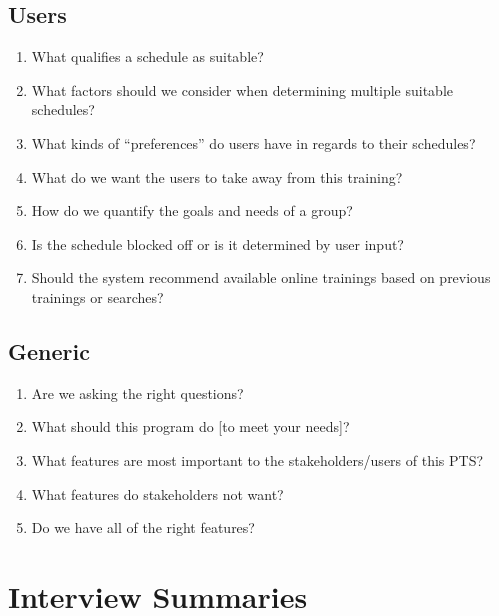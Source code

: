 \documentclass[12pt]{article}
\begin{document}
\subsection{Users}
\begin{enumerate}
\item What qualifies a schedule as suitable?
\item What factors should we consider when determining multiple suitable schedules?
\item What kinds of “preferences” do users have in regards to their schedules?
\item What do we want the users to take away from this training? 
\item How do we quantify the goals and needs of a group? 
\item Is the schedule blocked off or is it determined by user input?
\item Should the system recommend available online trainings based on previous trainings or searches? 
\end{enumerate}
\subsection{Generic}
\begin{enumerate}
\item Are we asking the right questions?
\item What should this program do [to meet your needs]?
\item What features are most important to the stakeholders/users of this PTS? 
\item What features do stakeholders not want? 
\item Do we have all of the right features?
\end{enumerate}
\section{Interview Summaries}
\end{document}
